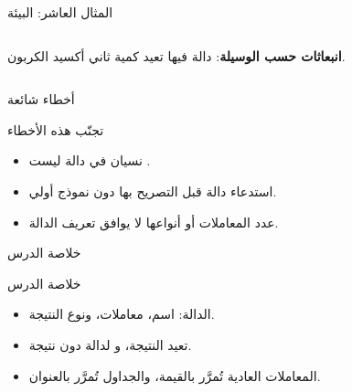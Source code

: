 \documentclass[aspectratio=169, 11pt, t, xcolor={table}]{beamer}
\begin{document}
\begin{frame}[t]{المثال العاشر: البيئة}
    \begin{columns}[T]
        {\small \textbf{انبعاثات حسب الوسيلة}: دالة فيها  تعيد كمية ثاني أكسيد الكربون.\par}
        \vspace{0.3cm}
    \end{columns}
\end{frame}

\begin{frame}{أخطاء شائعة}
    \begin{obox}{\faExclamationTriangle\quad تجنّب هذه الأخطاء}
        \begin{itemize}
            \item نسيان  في دالة ليست .
            \item استدعاء دالة قبل التصريح بها دون نموذج أولي.
            \item عدد المعاملات أو أنواعها لا يوافق تعريف الدالة.
        \end{itemize}
    \end{obox}
\end{frame}

\begin{frame}{خلاصة الدرس}
    \begin{tbox}{\faCheckCircle\quad خلاصة الدرس}
        \begin{itemize}
            \item الدالة: اسم، معاملات، ونوع النتيجة.
            \item {} تعيد النتيجة، و لدالة دون نتيجة.
            \item المعاملات العادية تُمرَّر بالقيمة، والجداول تُمرَّر بالعنوان.
        \end{itemize}
    \end{tbox}
\end{frame}
\end{document}
